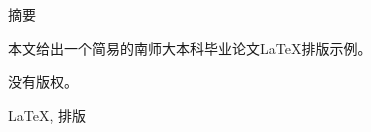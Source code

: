 \clearpage
\thispagestyle{plain}
{}

\centerline{\heiti 摘\quad 要}

\linespread{1.4} \bigskip

本文给出一个简易的南师大本科毕业论文\LaTeX 排版示例。

没有版权。

\bigskip

\LaTeX, 排版
